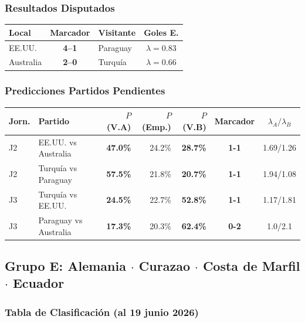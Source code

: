 \documentclass[11pt,a4paper]{article}
\newcommand{\prob}[1]{\textbf{#1\%}}
\begin{document}
\subsubsection*{Resultados Disputados}

\begin{center}
\begin{tabular}{@{}lclc@{}}
\toprule
\textbf{Local} & \textbf{Marcador} & \textbf{Visitante} & \textbf{Goles E.} \\
\midrule
  EE.UU. & \textbf{4--1} & Paraguay & $\lambda=0.83$ \\
  Australia & \textbf{2--0} & Turquía & $\lambda=0.66$ \\
\bottomrule
\end{tabular}
\end{center}

\subsubsection*{Predicciones Partidos Pendientes}


\begin{center}
\begin{tabular}{@{}llrrrcc@{}}
\toprule
\textbf{Jorn.} & \textbf{Partido} & \textbf{$P$(V.A)} & \textbf{$P$(Emp.)} & \textbf{$P$(V.B)} & \textbf{Marcador} & \textbf{$\lambda_A/\lambda_B$} \\
\midrule
  J2 & EE.UU. vs Australia & \cellcolor{yellow!30}\prob{47.0} & 24.2\% & \cellcolor{red!15}\prob{28.7} & \textbf{1-1} & 1.69/1.26 \\
  J2 & Turquía vs Paraguay & \cellcolor{yellow!30}\prob{57.5} & 21.8\% & \cellcolor{red!15}\prob{20.7} & \textbf{1-1} & 1.94/1.08 \\
  J3 & Turquía vs EE.UU. & \cellcolor{red!15}\prob{24.5} & 22.7\% & \cellcolor{yellow!30}\prob{52.8} & \textbf{1-1} & 1.17/1.81 \\
  J3 & Paraguay vs Australia & \cellcolor{red!15}\prob{17.3} & 20.3\% & \cellcolor{yellow!30}\prob{62.4} & \textbf{0-2} & 1.0/2.1 \\
\bottomrule
\end{tabular}
\end{center}


\subsection{Grupo E: Alemania $\cdot$ Curazao $\cdot$ Costa de Marfil $\cdot$ Ecuador}

\subsubsection*{Tabla de Clasificación (al 19 junio 2026)}
\end{document}
